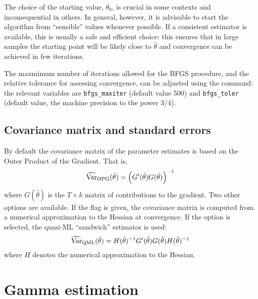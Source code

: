 The choice of the starting value, $\theta_0$, is crucial in some contexts
and inconsequential in others. In general, however, it is
advisable to start the algorithm from ``sensible'' values whenever
possible. If a consistent estimator is available, this is usually a
safe and efficient choice: this ensures that in large samples the
starting point will be likely close to $\hat{\theta}$ and convergence
can be achieved in few iterations. 

The maxmimum number of iterations allowed for the BFGS procedure, and
the relative tolerance for assessing convergence, can be adjusted
using the  command: the relevant variables are
\verb+bfgs_maxiter+ (default value 500) and \verb+bfgs_toler+ (default
value, the machine precision to the power 3/4).

\subsection{Covariance matrix and standard errors}

By default the covariance matrix of the parameter estimates is
based on the Outer Product of the Gradient.  That is,
\[
\widehat{\mbox{Var}}_{\mbox{\scriptsize OPG}}(\hat{\theta}) =
  \left(G'(\hat{\theta}) G(\hat{\theta}) \right)^{-1}
\]
where $G(\hat{\theta})$ is the $T \times k$ matrix of contributions to
the gradient.  Two other options are available.  If the
 flag is given, the covariance matrix is computed from
a numerical approximation to the Hessian at convergence.  If the
 option is selected, the quasi-ML ``sandwich''
estimator is used:
\[
\widehat{\mbox{Var}}_{\mbox{\scriptsize QML}}(\hat{\theta}) = H(\hat{\theta})^{-1}
  G'(\hat{\theta}) G(\hat{\theta}) H(\hat{\theta})^{-1}
\]
where $H$ denotes the numerical approximation to the Hessian.

\section{Gamma estimation}
\label{sec:gamma}

